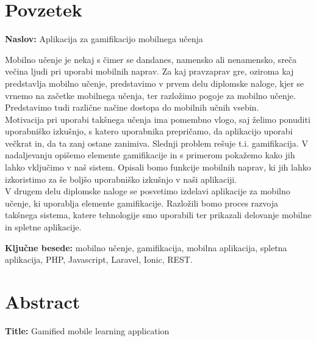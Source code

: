 \documentclass[a4paper, 12pt]{book}
\newcommand{\tkeywords}{mobilno učenje, gamifikacija, mobilna aplikacija, spletna aplikacija, PHP, Javascript, Laravel, Ionic, REST}
\newcommand{\clearemptydoublepage}{\newpage{\pagestyle{empty}\cleardoublepage}}
\begin{document}
\clearemptydoublepage

\chapter*{Povzetek}

\noindent\textbf{Naslov:} Aplikacija za gamifikacijo mobilnega učenja
\bigskip

\noindent Mobilno učenje je nekaj s čimer se dandanes, namensko ali nenamensko, sreča večina ljudi pri uporabi mobilnih naprav. Za kaj pravzaprav gre, oziroma kaj predstavlja mobilno učenje, predstavimo v prvem delu diplomske naloge, kjer se vrnemo na začetke mobilnega učenja, ter razložimo pogoje za mobilno učenje. Predstavimo tudi različne načine dostopa do mobilnih učnih vsebin.\\Motivacija pri uporabi takšnega učenja ima pomembno vlogo, saj želimo ponuditi uporabniško izkušnjo, s katero uporabnika prepričamo, da aplikacijo uporabi večkrat in, da ta zanj ostane zanimiva. Slednji problem rešuje t.i. gamifikacija. V nadaljevanju opišemo elemente gamifikacije in s primerom pokažemo kako jih lahko vključimo v naš sistem. Opisali bomo funkcije mobilnih naprav, ki jih lahko izkoristimo za še boljšo uporabniško izkušnjo v naši aplikaciji.\\V drugem delu diplomske naloge se posvetimo izdelavi aplikacije za mobilno učenje, ki uporablja elemente gamifikacije. Razložili bomo proces razvoja takšnega sistema, katere tehnologije smo uporabili ter prikazali delovanje mobilne in spletne aplikacije.

\bigskip

\noindent\textbf{Ključne besede:} \tkeywords.
\clearemptydoublepage

\chapter*{Abstract}

\noindent\textbf{Title:} Gamified mobile learning application
\bigskip
\end{document}
